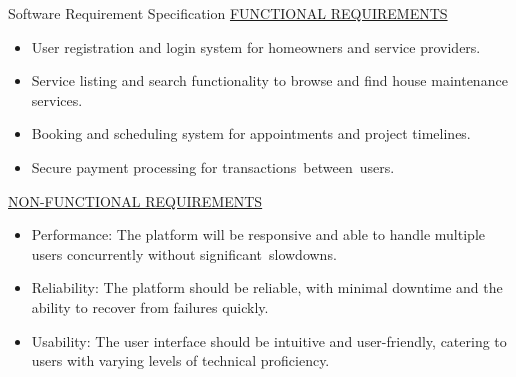 \documentclass{beamer} %
\begin{document}
\begin{frame}{Software Requirement Specification}
         \underline\h{ FUNCTIONAL REQUIREMENTS}
       \begin{itemize}
        \small\item User registration and login system for homeowners and service providers.
        \small\item Service listing and search functionality to browse and find house maintenance     services.
        \small\item Booking and scheduling system for appointments and project timelines.
        \small\item Secure payment processing for transactions between users.
        \br
        \end{itemize}
        \underline\h{ NON-FUNCTIONAL REQUIREMENTS}
        \begin{itemize}       
        \small\item Performance: The platform will be responsive and able to handle multiple users concurrently without significant slowdowns.
        \small\item Reliability: The platform should be reliable, with minimal downtime and the ability to recover from failures quickly.
        \small\item Usability: The user interface should be intuitive and user-friendly, catering to users with varying levels of technical proficiency.
        \end{itemize}
        
    
    \vspace{10pt} %
    \begin{figure}
        \hfill
    \end{figure}
\end{frame}
%       
   
\end{document}
